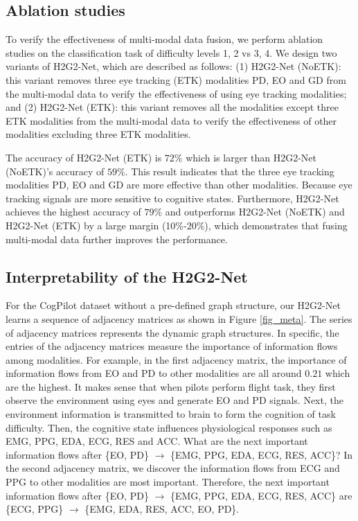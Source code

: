 \documentclass[letterpaper]{article} %
\begin{document}
\subsection{Ablation studies}

To verify the effectiveness of multi-modal data fusion, we perform ablation studies on the classification task of difficulty levels 1, 2 vs 3, 4. We design two variants of H2G2-Net, which are described as follows: (1) H2G2-Net (NoETK): this variant removes three eye tracking (ETK) modalities PD, EO and GD from the multi-modal data to verify the effectiveness of using eye tracking modalities; and (2) H2G2-Net (ETK): this variant removes all the modalities except three ETK modalities from the multi-modal data to verify the effectiveness of other modalities excluding three ETK modalities.

The accuracy of H2G2-Net (ETK) is $72\%$ which is larger than H2G2-Net (NoETK)'s accuracy of $59\%$. This result indicates that the three eye tracking modalities PD, EO and GD are more effective than other modalities. Because eye tracking signals are more sensitive to cognitive states. Furthermore, H2G2-Net achieves the highest accuracy of $79\%$ and outperforms H2G2-Net (NoETK) and H2G2-Net (ETK) by a large margin (10\%-20\%), which demonstrates that fusing multi-modal data further improves the performance.


\subsection{Interpretability of the H2G2-Net}

For the CogPilot dataset without a pre-defined graph structure, our H2G2-Net learns a sequence of adjacency matrices as shown in Figure \ref{fig_meta}. The series of adjacency matrices represents the dynamic graph structures. In specific, the entries of the adjacency matrices measure the importance of information flows among modalities. For example, in the first adjacency matrix, the importance of information flows from EO and PD to other modalities are all around $0.21$ which are the highest. It makes sense that when pilots perform flight task, they first observe the environment using eyes and generate EO and PD signals. Next, the environment information is transmitted to brain to form the cognition of task difficulty. Then, the cognitive state influences physiological responses such as EMG, PPG, EDA, ECG, RES and ACC. What are the next important information flows after \{EO, PD\} $\rightarrow$ \{EMG, PPG, EDA, ECG, RES, ACC\}? In the second adjacency matrix, we discover the information flows from ECG and PPG to other modalities are most important. Therefore, the next important information flows after \{EO, PD\} $\rightarrow$ \{EMG, PPG, EDA, ECG, RES, ACC\} are \{ECG, PPG\} $\rightarrow$ \{EMG, EDA, RES, ACC, EO, PD\}.
\end{document}
